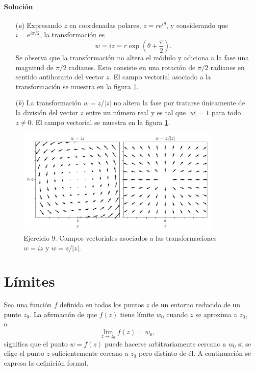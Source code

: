 \documentclass[a4paper]{report}
\begin{document}
\paragraph{Solución}
\begin{enumerate}
 \item[(\textit{a})] Expresando \(z\) en coordenadas polares, \(z=re^{i\theta}\), y considerando que \(i=e^{i\pi/2}\), la transformación es
 \[
  w=iz=r\exp\left(\theta+\dfrac{\pi}{2}\right).
 \]
 Se observa que la transformación no altera el módulo y adiciona a la fase una magnitud de \(\pi/2\) radianes. Esto consiste en una rotación de \(\pi/2\) radianes en sentido antihorario del vector \(z\). El campo vectorial asociado a la transformación se muestra en la figura \ref{fig:exercise_14_09}.
 \item[(\textit{b})] La transformación \(w=z/|z|\) no altera la fase por tratarse únicamente de la división del vector \(z\) entre un número real y es tal que \(|w|=1\) para todo \(z\neq0\). El campo vectorial se muestra en la figura \ref{fig:exercise_14_09}.
\end{enumerate}
\begin{figure}[!htb]
 \begin{center}
 \includegraphics[width=0.9\textwidth]{figuras/exercise_14_09.pdf}
 \caption{\label{fig:exercise_14_09} Ejercicio 9. Campos vectoriales asociados a las transformaciones \(w=iz\) y \(w=z/|z|\).}
 \end{center}
\end{figure}

\section{Límites}

Sea una función \(f\) definida en todos los puntos \(z\) de un entorno reducido de un punto \(z_0\). La afirmación de que \(f(z)\) tiene límite \(w_0\) cuando \(z\) se aproxima a \(z_0\), o
\begin{equation}\label{eq:limit_statement}
 \lim_{z\to z_0}f(z)=w_0, 
\end{equation}
significa que el punto \(w=f(z)\) puede hacerse arbitrariamente cercano a \(w_0\) si se elige el punto \(z\) suficientemente cercano a \(z_0\) pero distinto de él. A continuación se expresa la definición formal.
\end{document}
